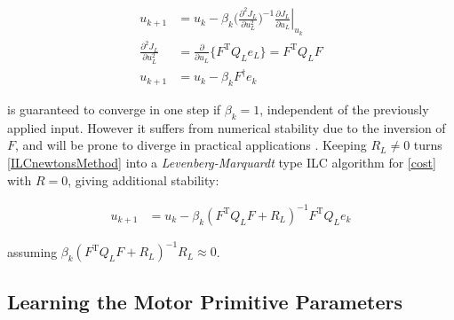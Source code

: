 \documentclass[10pt,a4paper]{article}
\newcommand\at[2]{\left.#1\right|_{#2}} %
\newcommand{\todo}{\textcolor{red}{TODO}} %
\newcommand{\error}{e} %
\newcommand{\sysInput}{u} %
\newcommand{\ValueFunction}{J}
\begin{document}
\begin{equation}
\begin{aligned}
\sysInput_{k+1} &= \sysInput_k - \beta_k\Big(\frac{\partial^{2}\ValueFunction_L}{\partial\sysInput^{2}_L}\Big)^{-1}\at{\frac{\partial{\ValueFunction_L}}{\partial{\sysInput_L}}}{\sysInput_k} \\
\frac{\partial^{2}\ValueFunction_L}{\partial\sysInput^{2}_L} &= \frac{\partial}{\partial\sysInput_L}\{F^{\mathrm{T}}Q_L\error_L\} = F^{\mathrm{T}}Q_LF \\
\sysInput_{k+1} &= \sysInput_k - \beta_kF^{\dagger}\error_k
\end{aligned}
\label{ILCnewtonsMethod}
\end{equation}

is guaranteed to converge in one step if $\beta_k = 1$, independent of the previously applied input. However it suffers from numerical stability due to the inversion of $F$, and will be prone to diverge in practical applications \cite{Bristow06}. Keeping $R_L \neq 0$ turns \eqref{ILCnewtonsMethod} into a \emph{Levenberg-Marquardt} \cite{Nocedal99} type ILC algorithm for \eqref{cost} with $R = 0$, giving additional stability:

\begin{equation}
\begin{aligned}
\sysInput_{k+1} &= \sysInput_k - \beta_k(F^{\mathrm{T}}Q_LF + R_L)^{-1}F^{\mathrm{T}}Q_L\error_k
\end{aligned}
\label{ILClevenbergMarquardt}
\end{equation}

assuming $\beta_k(F^{\mathrm{T}}Q_LF + R_L)^{-1}R_L \approx 0$.


\subsection{Learning the Motor Primitive Parameters}\label{learningMPs}
\end{document}
